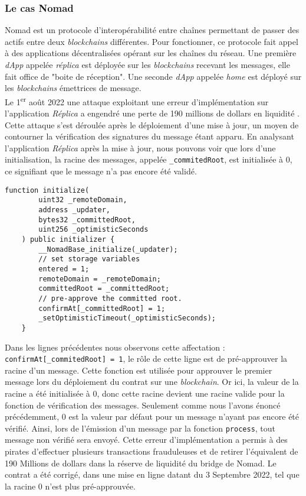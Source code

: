 \subsubsection{Le cas Nomad}
\gls{Nomad} est un protocole d'interopérabilité entre chaînes permettant de passer des \gls{actif}s entre deux \textit{\gls{blockchain}s} différentes. 
Pour fonctionner, ce protocole fait appel à des applications décentralisées opérant sur les chaînes du réseau. 
Une première \textit{\gls{dApp}} appelée \textit{réplica} est déployée sur les \textit{\gls{blockchain}s} recevant les messages, elle fait office de "boite de réception". 
Une seconde \textit{\gls{dApp}} appelée \textit{home} est déployé sur les \textit{\gls{blockchain}s} émettrices de message. \\
Le 1\textsuperscript{er} août 2022 une attaque exploitant une erreur d'implémentation sur l'application \textit{Réplica} a engendré une perte de 190 millions de dollars en liquidité \cite{NomadMedium} \cite{NomadRekt}.
Cette attaque s'est déroulée après le déploiement d'une mise à jour, un moyen de contourner la vérification des signatures du message étant apparu. 
En analysant l'application \textit{Réplica} après la mise à jour, nous pouvons voir que lors d'une initialisation, la racine des messages, appelée \texttt{\_commitedRoot}, est initialisée à $0$, ce signifiant que le message n'a pas encore été validé. 
\begin{lstlisting}[caption={Fonction \textit{initialize} de \textit{Réplica} contenant une erreur \cite{NomadGitError}}]
    function initialize(
        uint32 _remoteDomain,
        address _updater,
        bytes32 _committedRoot,
        uint256 _optimisticSeconds
    ) public initializer {
        __NomadBase_initialize(_updater);
        // set storage variables
        entered = 1;
        remoteDomain = _remoteDomain;
        committedRoot = _committedRoot;
        // pre-approve the committed root.
        confirmAt[_committedRoot] = 1;
        _setOptimisticTimeout(_optimisticSeconds);
    }
\end{lstlisting}

Dans les lignes précédentes nous observons cette affectation : \texttt{confirmAt[\_commitedRoot] = 1}, le rôle de cette ligne est de pré-approuver la racine d'un message. 
Cette fonction est utilisée pour approuver le premier message lors du déploiement du contrat sur une \textit{\gls{blockchain}}. 
Or ici, la valeur de la racine a été initialisée à $0$, donc cette racine devient une racine valide pour la fonction de vérification des messages. 
Seulement comme nous l'avons énoncé précédemment, $0$ est la valeur par défaut pour un message n'ayant pas encore été vérifié. 
Ainsi, lors de l'émission d'un message par la fonction \texttt{process}, tout message non vérifié sera envoyé. 
Cette erreur d'implémentation a permis à des pirates d'effectuer plusieurs transactions frauduleuses et de retirer l'équivalent de 190 Millions de dollars dans la réserve de liquidité du bridge de \gls{Nomad}. 
Le contrat a été corrigé, dans une mise en ligne datant du 3 Septembre 2022, tel que la racine $0$ n'est plus pré-approuvée. 

